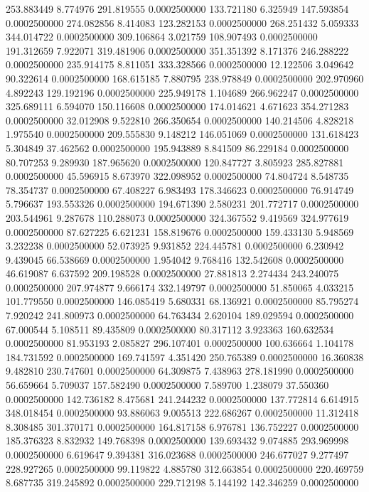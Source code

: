 253.883449 8.774976 291.819555 0.0002500000
133.721180 6.325949 147.593854 0.0002500000
274.082856 8.414083 123.282153 0.0002500000
268.251432 5.059333 344.014722 0.0002500000
309.106864 3.021759 108.907493 0.0002500000
191.312659 7.922071 319.481906 0.0002500000
351.351392 8.171376 246.288222 0.0002500000
235.914175 8.811051 333.328566 0.0002500000
12.122506 3.049642 90.322614 0.0002500000
168.615185 7.880795 238.978849 0.0002500000
202.970960 4.892243 129.192196 0.0002500000
225.949178 1.104689 266.962247 0.0002500000
325.689111 6.594070 150.116608 0.0002500000
174.014621 4.671623 354.271283 0.0002500000
32.012908 9.522810 266.350654 0.0002500000
140.214506 4.828218 1.975540 0.0002500000
209.555830 9.148212 146.051069 0.0002500000
131.618423 5.304849 37.462562 0.0002500000
195.943889 8.841509 86.229184 0.0002500000
80.707253 9.289930 187.965620 0.0002500000
120.847727 3.805923 285.827881 0.0002500000
45.596915 8.673970 322.098952 0.0002500000
74.804724 8.548735 78.354737 0.0002500000
67.408227 6.983493 178.346623 0.0002500000
76.914749 5.796637 193.553326 0.0002500000
194.671390 2.580231 201.772717 0.0002500000
203.544961 9.287678 110.288073 0.0002500000
324.367552 9.419569 324.977619 0.0002500000
87.627225 6.621231 158.819676 0.0002500000
159.433130 5.948569 3.232238 0.0002500000
52.073925 9.931852 224.445781 0.0002500000
6.230942 9.439045 66.538669 0.0002500000
1.954042 9.768416 132.542608 0.0002500000
46.619087 6.637592 209.198528 0.0002500000
27.881813 2.274434 243.240075 0.0002500000
207.974877 9.666174 332.149797 0.0002500000
51.850065 4.033215 101.779550 0.0002500000
146.085419 5.680331 68.136921 0.0002500000
85.795274 7.920242 241.800973 0.0002500000
64.763434 2.620104 189.029594 0.0002500000
67.000544 5.108511 89.435809 0.0002500000
80.317112 3.923363 160.632534 0.0002500000
81.953193 2.085827 296.107401 0.0002500000
100.636664 1.104178 184.731592 0.0002500000
169.741597 4.351420 250.765389 0.0002500000
16.360838 9.482810 230.747601 0.0002500000
64.309875 7.438963 278.181990 0.0002500000
56.659664 5.709037 157.582490 0.0002500000
7.589700 1.238079 37.550360 0.0002500000
142.736182 8.475681 241.244232 0.0002500000
137.772814 6.614915 348.018454 0.0002500000
93.886063 9.005513 222.686267 0.0002500000
11.312418 8.308485 301.370171 0.0002500000
164.817158 6.976781 136.752227 0.0002500000
185.376323 8.832932 149.768398 0.0002500000
139.693432 9.074885 293.969998 0.0002500000
6.619647 9.394381 316.023688 0.0002500000
246.677027 9.277497 228.927265 0.0002500000
99.119822 4.885780 312.663854 0.0002500000
220.469759 8.687735 319.245892 0.0002500000
229.712198 5.144192 142.346259 0.0002500000
